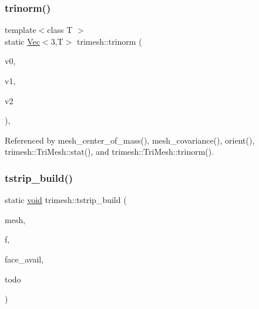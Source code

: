 \mbox{\label{namespacetrimesh_a23c6cbae882a5c97cb864c977effea43}} 
\subsubsection{\texorpdfstring{trinorm()}{trinorm()}}
{\footnotesize\ttfamily template$<$class T $>$ \\
static \hyperlink{classtrimesh_1_1Vec}{Vec}$<$3,T$>$ trimesh\+::trinorm (\begin{DoxyParamCaption}\item[{const \hyperlink{classtrimesh_1_1Vec}{Vec}$<$ 3, T $>$ \&}]{v0,  }\item[{const \hyperlink{classtrimesh_1_1Vec}{Vec}$<$ 3, T $>$ \&}]{v1,  }\item[{const \hyperlink{classtrimesh_1_1Vec}{Vec}$<$ 3, T $>$ \&}]{v2 }\end{DoxyParamCaption})\hspace{0.3cm}{\ttfamily [inline]}, {\ttfamily [static]}}



Referenced by mesh\+\_\+center\+\_\+of\+\_\+mass(), mesh\+\_\+covariance(), orient(), trimesh\+::\+Tri\+Mesh\+::stat(), and trimesh\+::\+Tri\+Mesh\+::trinorm().

\mbox{\label{namespacetrimesh_ab831661ae18fac13b4afec2d2aec051e}} 
\subsubsection{\texorpdfstring{tstrip\+\_\+build()}{tstrip\_build()}}
{\footnotesize\ttfamily static \hyperlink{namespacetrimesh_a784ddfd979e1c579bda795a8edfc3f43}{void} trimesh\+::tstrip\+\_\+build (\begin{DoxyParamCaption}\item[{\hyperlink{classtrimesh_1_1TriMesh}{Tri\+Mesh} \&}]{mesh,  }\item[{int}]{f,  }\item[{vector$<$ signed char $>$ \&}]{face\+\_\+avail,  }\item[{vector$<$ int $>$ \&}]{todo }\end{DoxyParamCaption})\hspace{0.3cm}{\ttfamily [static]}}



